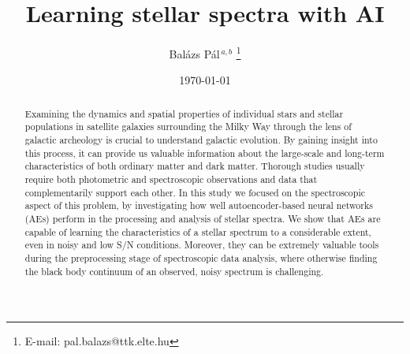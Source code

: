 \documentclass[12pt, a4paper]{article}
\title{Learning stellar spectra with AI}
\author{Balázs Pál$^{\,a,b}$%
    \thanks{E-mail: pal.balazs@ttk.elte.hu}
}
\affil{%
    $^{a}$Eötvös Loránd University, Department of Physics of Complex Systems \\
    $^{b}$Wigner Research Centre for Physics, Heavy-ion Physics Research Group
}
\date{\today}
\begin{document}
\maketitle

\begin{abstract}
Examining the dynamics and spatial properties of individual stars and stellar populations in satellite galaxies surrounding the Milky Way through the lens of galactic archeology is crucial to understand galactic evolution. By gaining insight into this process, it can provide us valuable information about the large-scale and long-term characteristics of both ordinary matter and dark matter. Thorough studies usually require both photometric and spectroscopic observations and data that complementarily support each other. In this study we focused on the spectroscopic aspect of this problem, by investigating how well autoencoder-based neural networks (AEs) perform in the processing and analysis of stellar spectra. We show that AEs are capable of learning the characteristics of a stellar spectrum to a considerable extent, even in noisy and low S/N conditions. Moreover, they can be extremely valuable tools during the preprocessing stage of spectroscopic data analysis, where otherwise finding the black body continuum of an observed, noisy spectrum is challenging.
\end{abstract}
\end{document}
